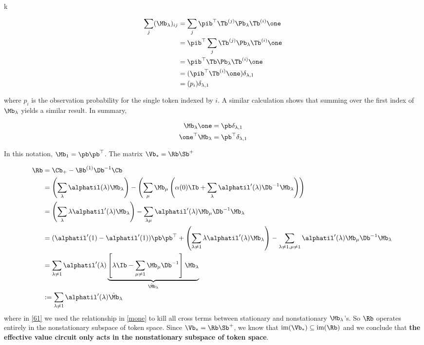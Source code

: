 k\documentclass{article}
\begin{document}
\begin{align}
    \sum_j(\Mb_\lambda)_{ij} &= \sum_j \pib^\top \Tb^{(j)}\Pb_\lambda\Tb^{(i)}\one\\
    &= \pib^\top \sum_j \Tb^{(j)}\Pb_\lambda\Tb^{(i)}\one\\
    &=  \pib^\top \Tb\Pb_\lambda\Tb^{(i)}\one \\
    &= (\pib^\top \Tb^{(i)}\one) \delta_{\lambda,1} \\
    &= (p_i) \delta_{\lambda,1}
\end{align}

where $p_i$ is the observation probability for the single token indexed by $i$. A similar calculation shows that summing over the first index of $\Mb_\lambda$ yields a similar result. In summary,

\begin{align}\label{mone}
    \Mb_\lambda \one &= \pb \delta_{\lambda,1} \\
    \one^\top \Mb_\lambda &= \pb^\top \delta_{\lambda,1}
\end{align}

In this notation, $\Mb_1 = \pb \pb^\top$.
The matrix $\Vb_* = \Rb \Sb^{+}$ %

\begin{align}
    \Rb &= \Cb_+ - \Bb^{(1)}\Db^{-1}\Cb \\
    &= \left(\sum_\lambda \alphatil(\lambda) \Mb_\lambda\right) - \left(\sum_\mu \Mb_\mu \left(\alpha(0)\Ib + \sum_\lambda \alphatil'(\lambda)\Db^{-1} \Mb_\lambda\right) \right) \\
    &= \left(\sum_\lambda \lambda\alphatil'(\lambda)\Mb_\lambda\right) - \sum_{\lambda\mu}\alphatil'(\lambda)\Mb_\mu\Db^{-1}\Mb_\lambda\ \\
    &= (\alphatil'(1) - \alphatil'(1))\pb \pb^\top + \left(\sum_{\lambda \neq 1}\lambda\alphatil'(\lambda)\Mb_\lambda\right) - \sum_{\lambda\neq 1, \mu\neq 1}\alphatil'(\lambda)\Mb_\mu\Db^{-1}\Mb_\lambda\ \label{61} \\
    &= \sum_{\lambda \neq 1}\alphatil'(\lambda) \underbrace{\left [ \lambda \Ib - \sum_{\mu\neq 1}\Mb_\mu \Db^{-1}\right]\Mb_\lambda}_{\hat{\Mb}_\lambda} \\
    &:=  \sum_{\lambda \neq 1}\alphatil'(\lambda) \hat{\Mb}_\lambda \label{r}
\end{align}
 where in \eqref{61} we used the relationship in \eqref{mone} to kill all cross terms between stationary and nonstationary $\Mb_\lambda$'s. So $\Rb$ operates entirely in the nonstationary subspace of token space. Since $\Vb_* = \Rb \Sb^+$, we know that $\textrm{im}(\Vb_*) \subseteq \textrm{im}(\Rb)$ and we conclude that \textbf{the effective value circuit only acts in the nonstationary subspace of token space}. 
 
\end{document}
